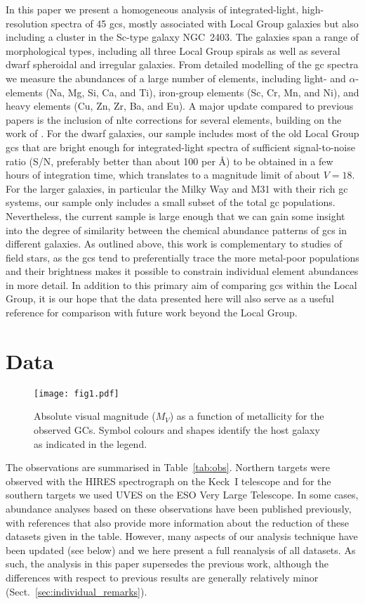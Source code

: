 \documentclass{aa}
\begin{document}
In this paper we present a homogeneous analysis of integrated-light, high-resolution spectra of 45 \acp{gc}, mostly associated with Local Group galaxies but also including a cluster in the Sc-type galaxy NGC~2403. The galaxies span a range of morphological types, including all three Local Group spirals as well as several dwarf spheroidal and irregular galaxies. 
From detailed modelling of the \ac{gc} spectra we measure the abundances of a large number of elements,
including light- and $\alpha$-elements (Na, Mg, Si, Ca, and Ti), iron-group elements (Sc, Cr, Mn, and Ni), and heavy elements (Cu, Zn, Zr, Ba, and Eu). 
A major update compared to previous papers is the inclusion of \ac{nlte} corrections for several elements, building on the work of \citet{Eitner2019,Eitner2020}. For the dwarf galaxies, our sample includes most of the old Local Group \acp{gc} that are bright enough for integrated-light spectra of sufficient signal-to-noise ratio (S/N, preferably better than about 100 per \AA) to be obtained in a few hours of integration time, which translates to a magnitude limit of about $V=18$. For the larger galaxies, in particular the Milky Way and M31 with their rich \ac{gc} systems, our sample only includes a small subset of the total \ac{gc} populations. Nevertheless, the current sample is large enough that we can gain some insight into the degree of similarity between the chemical abundance patterns of \acp{gc} in different galaxies. As outlined above, this work is complementary to studies of field stars, as the \acp{gc} tend to preferentially trace the more metal-poor populations and their brightness makes it possible to constrain individual element abundances in more detail. In addition to this primary aim of comparing \acp{gc} within the Local Group, it is our hope that the data presented here will also serve as a useful reference for comparison with future work beyond the Local Group.

\section{Data}


\begin{figure}
\centering
\texttt{[image: fig1.pdf]}
\caption{\label{fig:femv}Absolute visual magnitude ($M_V$) as a function of metallicity for the observed GCs. Symbol colours and shapes identify the host galaxy as indicated in the legend.}
\end{figure}


The observations are summarised in Table~\ref{tab:obs}. Northern targets were observed with the HIRES spectrograph \citep{Vogt1994} on the Keck~I telescope and for the southern targets we used UVES \citep{Dekker2000} on the ESO Very Large Telescope.
In some cases, abundance analyses based on these observations have been published previously, with references that also provide more information about the reduction of these datasets given in the table. However, many aspects of our analysis technique have been updated (see below) and we here present a full reanalysis of all datasets. As such, the analysis in this paper supersedes the previous work, although the differences with respect to previous results are generally relatively minor (Sect.~\ref{sec:individual_remarks}). 
\end{document}
